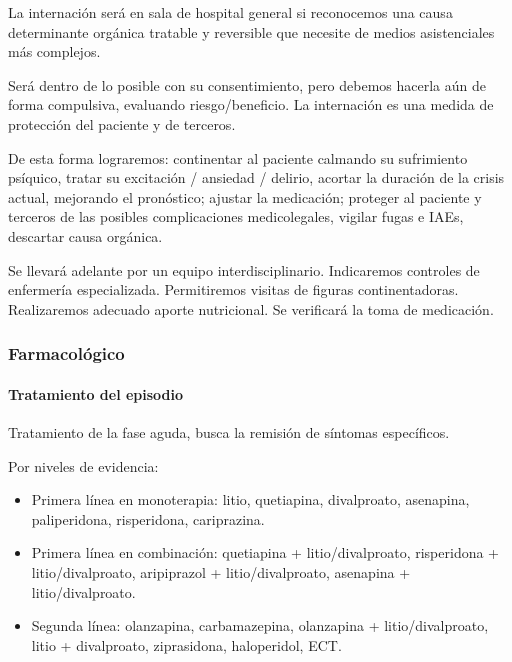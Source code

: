La internación será en sala de hospital general si reconocemos una causa determinante orgánica tratable y reversible que necesite de medios asistenciales más complejos. 

Será dentro de lo posible con su consentimiento, pero debemos hacerla aún de forma compulsiva, evaluando riesgo/beneficio. La internación es una medida de protección del paciente y de terceros.

De esta forma lograremos: continentar al paciente calmando su sufrimiento psíquico, tratar su excitación / ansiedad / delirio, acortar la duración de la crisis actual, mejorando el pronóstico; ajustar la medicación; proteger al paciente y terceros de las posibles complicaciones medicolegales, vigilar fugas e IAEs, descartar causa orgánica.

Se llevará adelante por un equipo interdisciplinario. Indicaremos controles de enfermería especializada. Permitiremos visitas de figuras continentadoras. Realizaremos adecuado aporte nutricional. Se verificará la toma de medicación.
\subsubsection*{Farmacológico}
\paragraph{Tratamiento del episodio}
Tratamiento de la fase aguda, busca la remisión de síntomas específicos.

Por niveles de evidencia:
\begin{itemize}
	\item Primera línea en monoterapia: litio, quetiapina, divalproato, asenapina, paliperidona, risperidona, cariprazina.
	\item Primera línea en combinación: quetiapina + litio/divalproato, risperidona + litio/divalproato, aripiprazol + litio/divalproato, asenapina + litio/divalproato.
	\item Segunda línea: olanzapina, carbamazepina, olanzapina + litio/divalproato, litio + divalproato, ziprasidona, haloperidol, ECT.
\end{itemize}

